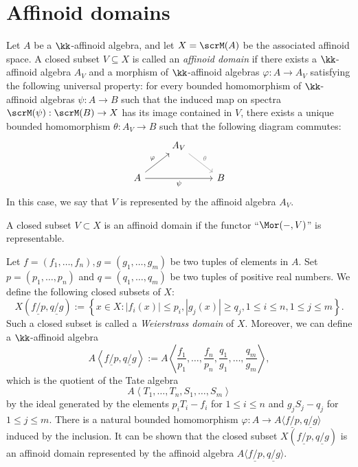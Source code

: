 \section{Affinoid domains}


    \begin{definition}\label{def:affinoid_domains}
        Let \(A\) be a \(\kk\)-affinoid algebra, and let \(X = \scrM(A)\) be the associated affinoid space.
        A closed subset \(V \subseteq X\) is called an \emph{affinoid domain} if there exists a \(\kk\)-affinoid algebra \(A_V\) and a morphism of \(\kk\)-affinoid algebras \(\varphi: A \to A_V\) satisfying the following universal property:
        for every bounded homomorphism of \(\kk\)-affinoid algebras \(\psi: A \to B\) such that the induced map on spectra \(\scrM(\psi): \scrM(B) \to X\) has its image contained in \(V\), there exists a unique bounded homomorphism \(\theta: A_V \to B\) such that the following diagram commutes:
        \[
        \begin{tikzcd}
            & A_V  \arrow[dr, gray, "\theta"] & \\
            A \arrow[ur, "\varphi"] \arrow[rr, "\psi"'] & & B
        \end{tikzcd}
        \]
        In this case, we say that \(V\) is represented by the affinoid algebra \(A_V\).
    \end{definition}
    \begin{slogan}
        A closed subset \(V \subset X\) is an affinoid domain if the functor ``\(\Mor(-, V)\)'' is representable.
    \end{slogan}



    \begin{construction}\label{cons:weierstrass_domain}
        Let \(f=(f_1,\ldots,f_n),g = (g_1,\ldots,g_m)\) be two tuples of elements in \(A\).
        Set \(p=(p_1,\ldots,p_n)\) and \(q=(q_1,\ldots,q_m)\) be two tuples of positive real numbers.
        We define the following closed subsets of \(X\):
        \[ X\left(\underline{f/p},\underline{q/g}\right) := \left\{ x \in X \colon |f_i(x)| \le p_i, |g_j(x)| \ge q_j, 1 \le i \le n, 1 \le j \le m \right\}. \]
        Such a closed subset is called a \emph{Weierstrass domain} of \(X\).
        Moreover, we can define a \(\kk\)-affinoid algebra
        \[ A\left\langle \underline{f/p},\underline{q/g} \right\rangle := A\left\langle \frac{f_1}{p_1},\ldots,\frac{f_n}{p_n}, \frac{q_1}{g_1},\ldots,\frac{q_m}{g_m} \right\rangle, \]
        which is the quotient of the Tate algebra
        \[ A\left\langle T_1,\ldots,T_n,S_1,\ldots,S_m \right\rangle \]
        by the ideal generated by the elements \(p_i T_i - f_i\) for \(1 \le i \le n\) and \(g_j S_j - q_j\) for \(1 \le j \le m\).
        There is a natural bounded homomorphism \(\varphi: A \to A\langle \underline{f/p},\underline{q/g} \rangle\) induced by the inclusion.
        It can be shown that the closed subset \(X(\underline{f/p},\underline{q/g})\) is an affinoid domain represented by the affinoid algebra \(A\langle \underline{f/p},\underline{q/g} \rangle\).
    \end{construction}

